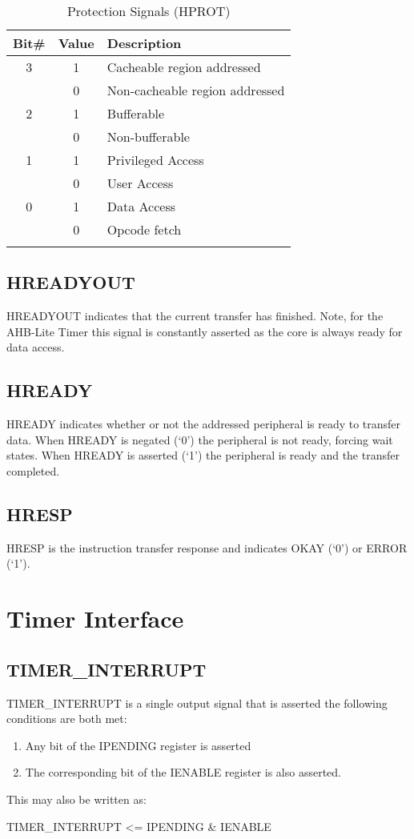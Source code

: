 \begin{longtable}[]{@{}ccl@{}}
\toprule
Bit\# & Value & Description\tabularnewline
\midrule
\endhead
3 & 1 & Cacheable region addressed\tabularnewline
& 0 & Non-cacheable region addressed\tabularnewline
2 & 1 & Bufferable\tabularnewline
& 0 & Non-bufferable\tabularnewline
1 & 1 & Privileged Access\tabularnewline
& 0 & User Access\tabularnewline
0 & 1 & Data Access\tabularnewline
& 0 & Opcode fetch\tabularnewline
\bottomrule
\caption{Protection Signals (HPROT)}
\end{longtable}

\subsection{HREADYOUT}\label{hreadyout}

HREADYOUT indicates that the current transfer has finished. Note, for
the AHB-Lite Timer this signal is constantly asserted as the core is
always ready for data access.

\subsection{HREADY}\label{hready}

HREADY indicates whether or not the addressed peripheral is ready to
transfer data. When HREADY is negated (`0') the peripheral is not ready,
forcing wait states. When HREADY is asserted (`1') the peripheral is
ready and the transfer completed.

\subsection{HRESP}\label{hresp}

HRESP is the instruction transfer response and indicates OKAY (`0') or
ERROR (`1').

\section{Timer Interface}\label{timer-interface}

\subsection{TIMER\_INTERRUPT}\label{timer_interrupt}

TIMER\_INTERRUPT is a single output signal that is asserted the
following conditions are both met:

\begin{enumerate}
\def\labelenumi{\arabic{enumi}.}
\item
  Any bit of the IPENDING register is asserted
\item
  The corresponding bit of the IENABLE register is also asserted.
\end{enumerate}

This may also be written as:

TIMER\_INTERRUPT \textless{}= IPENDING \& IENABLE


